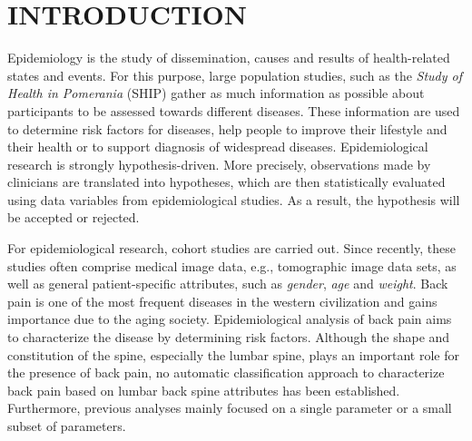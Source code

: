 \documentclass[a4paper,twoside]{style/article}
\begin{document}
\section{\uppercase{Introduction}}
\label{sec:Introduction}
Epidemiology is the study of dissemination, causes and results of health-related states and events.
For this purpose, large population studies, such as the \emph{Study of Health in Pomerania} (SHIP) \cite{SHIP} gather as much information as possible about participants to be assessed towards different diseases.
These information are used to determine risk factors for diseases, help people to improve their lifestyle and their health or to support diagnosis of widespread diseases.
Epidemiological research is strongly hypothesis-driven.
More precisely, observations made by clinicians are translated into hypotheses, which are then statistically evaluated using data variables from epidemiological studies.
As a result, the hypothesis will be accepted or rejected.

For epidemiological research, cohort studies are carried out.
Since recently, these studies often comprise medical image data, e.g., tomographic image data sets, as well as general patient-specific attributes, such as \emph{gender}, \emph{age} and \emph{weight}.
Back pain is one of the most frequent diseases in the western civilization and gains importance due to the aging society.
Epidemiological analysis of back pain aims to characterize the disease by determining risk factors.
Although the shape and constitution of the spine, especially the lumbar spine, plays an important role for the presence of back pain, no automatic classification approach to characterize back pain based on lumbar back spine attributes has been established.
Furthermore, previous analyses mainly focused on a single parameter or a small subset of parameters.
\end{document}
